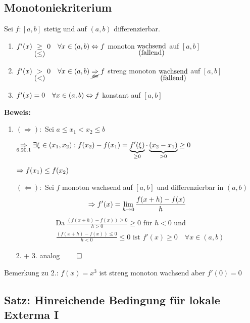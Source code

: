 \documentclass[10pt, a4paper, fleqn]{article}
\begin{document}
\subsection{Monotoniekriterium}
Sei $f: [a, b]$ stetig und auf $(a, b)$ differenzierbar.
\begin{enumerate}[1.]
    \item $f'(x) \underset{\hbox{$(\leq)$}}{\geq} 0 \quad \forall x \in (a, b)
    \Leftrightarrow f$ monoton $\underset{\hbox{(fallend)}}{\text{wachsend}}$ auf $[a, b]$
    \item $f'(x) \underset{\hbox{$(<)$}}{>} 0 \quad \forall x \in (a, b)
    \underset{\hbox{$\cancel{\Leftarrow}$}}{\Rightarrow} f$ streng monoton $\underset{\hbox{(fallend)}}{\text{wachsend}}$ auf $[a, b]$
    \item $f'(x) = 0 \quad \forall x \in (a, b) \Leftrightarrow f$ konstant auf $[a, b]$
\end{enumerate}
\textbf{Beweis: }
\begin{enumerate}[1.]
    \item $(\Rightarrow):$ Sei $a \leq x_1 < x_2 \leq b$

    $\underset{6.20.1}{\Rightarrow} \exists \xi \in (x_1, x_2): f(x_2) - f(x_1) =
    \underbrace{f'(\xi)}_{\geq 0} \cdot \underbrace{(x_2 - x_1)}_{> 0} \geq 0$

    $\Rightarrow f(x_1) \leq f(x_2)$

    $(\Leftarrow):$ Sei $f$ monoton wachsend auf $[a, b]$ und differenzierbar in
    $(a, b)$
    \[
        \Rightarrow f'(x) = \lim_{h \to 0} \frac{f(x + h) - f(x)}{h}    
    \]\[\begin{aligned}
        &\text{Da} \ \frac{(f(x + h) - f(x)) \geq 0}{h > 0} \geq 0 \text{ für } h < 0 \text{ und } \\
        &\frac{(f(x + h) - f(x)) \leq 0}{h < 0} \leq 0 \text{ ist }
        f'(x) \geq 0 \quad \forall x \in (a, b)
    \end{aligned}\]

    \item[2. + 3.] analog $\qed$
\end{enumerate}
Bemerkung zu 2.: $f(x) = x^3$ ist streng monoton wachsend aber $f'(0) = 0$

\subsection{Satz: Hinreichende Bedingung für lokale Exterma I}
\end{document}
